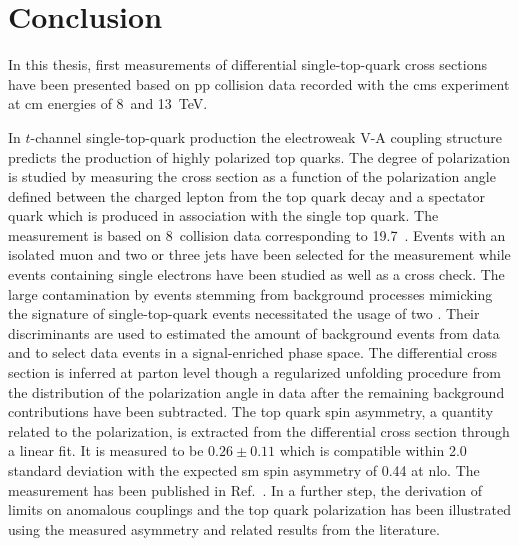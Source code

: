 \chapter*{Conclusion}

In this thesis, first measurements of differential single-top-quark cross sections have been presented based on \acrlong{pp} collision data recorded with the \gls{cms} experiment at \acrlong{cm} energies of 8~and 13~TeV.


In $t$-channel single-top-quark production the electroweak V-A coupling structure predicts the production of highly polarized top quarks. The degree of polarization is studied by measuring the cross section as a function of the polarization angle defined between the charged lepton from the top quark decay and a spectator quark which is produced in association with the single top quark. The measurement is based on 8~\TeV collision data corresponding to 19.7~\invfb. Events with an isolated muon and two or three jets have been selected for the measurement while events containing single electrons have been studied as well as a cross check. The large contamination by events stemming from background processes mimicking the signature of single-top-quark events necessitated the usage of two . Their discriminants are used to estimated the amount of background events from data and to select data events in a signal-enriched phase space. The differential cross section is inferred at parton level though a regularized unfolding procedure from the distribution of the polarization angle in data after the remaining background contributions have been subtracted. The top quark spin asymmetry, a quantity related to the polarization, is extracted from the differential cross section through a linear fit. It is measured to be $0.26\pm 0.11$ which is compatible within 2.0 standard deviation with the expected \gls{sm} spin asymmetry of 0.44 at \gls{nlo}. The measurement has been published in Ref.~\cite{Khachatryan:2015dzz}. In a further step, the derivation of limits on anomalous couplings and the top quark polarization has been illustrated using the measured asymmetry and related results from the literature.

